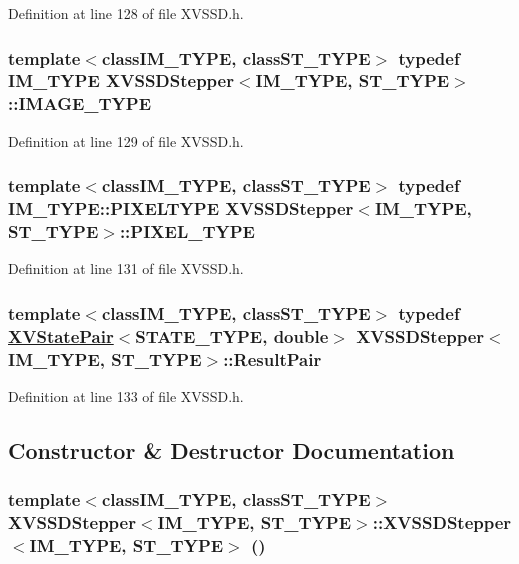 Definition at line 128 of file XVSSD.h.\label{XVSSDStepper_s1}
\hypertarget{class_XVSSDStepper_s1}{
\subsubsection[IMAGE_TYPE]{\setlength{\rightskip}{0pt plus 5cm}template$<$classIM\_\-TYPE, classST\_\-TYPE$>$ typedef IM\_\-TYPE XVSSDStepper$<$IM\_\-TYPE, ST\_\-TYPE$>$::IMAGE\_\-TYPE}}




Definition at line 129 of file XVSSD.h.\label{XVSSDStepper_s2}
\hypertarget{class_XVSSDStepper_s2}{
\subsubsection[PIXEL_TYPE]{\setlength{\rightskip}{0pt plus 5cm}template$<$classIM\_\-TYPE, classST\_\-TYPE$>$ typedef IM\_\-TYPE::PIXELTYPE XVSSDStepper$<$IM\_\-TYPE, ST\_\-TYPE$>$::PIXEL\_\-TYPE}}




Definition at line 131 of file XVSSD.h.\label{XVSSDStepper_s3}
\hypertarget{class_XVSSDStepper_s3}{
\subsubsection[ResultPair]{\setlength{\rightskip}{0pt plus 5cm}template$<$classIM\_\-TYPE, classST\_\-TYPE$>$ typedef \hyperlink{class_XVStatePair}{XVState\-Pair}$<$STATE\_\-TYPE, double$>$ XVSSDStepper$<$IM\_\-TYPE, ST\_\-TYPE$>$::Result\-Pair}}




Definition at line 133 of file XVSSD.h.

\subsection{Constructor \& Destructor Documentation}
\label{XVSSDStepper_a0}
\hypertarget{class_XVSSDStepper_a0}{
\subsubsection[XVSSDStepper]{\setlength{\rightskip}{0pt plus 5cm}template$<$classIM\_\-TYPE, classST\_\-TYPE$>$ XVSSDStepper$<$IM\_\-TYPE, ST\_\-TYPE$>$::XVSSDStepper$<$IM\_\-TYPE, ST\_\-TYPE$>$ ()}}




